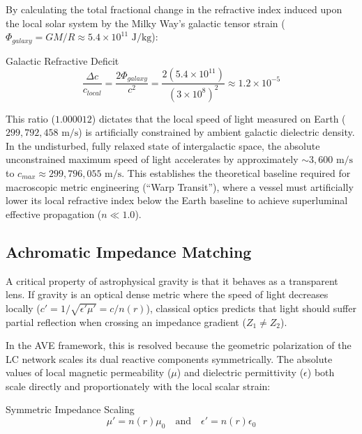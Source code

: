 By calculating the total fractional change in the refractive index induced upon the local solar system by the Milky Way's galactic tensor strain ($\Phi_{galaxy} = GM/R \approx 5.4 \times 10^{11} \text{ J/kg}$):
\begin{resultbox}{Galactic Refractive Deficit}
\begin{equation}
    \frac{\Delta c}{c_{local}} = \frac{2\Phi_{galaxy}}{c^2} = \frac{2(5.4 \times 10^{11})}{(3 \times 10^8)^2} \approx 1.2 \times 10^{-5}
\end{equation}
\end{resultbox}

This ratio ($1.000012$) dictates that the local speed of light measured on Earth ($299,792,458 \text{ m/s}$) is artificially constrained by ambient galactic dielectric density. In the undisturbed, fully relaxed state of intergalactic space, the absolute unconstrained maximum speed of light accelerates by approximately $\sim 3,600 \text{ m/s}$ to $c_{max} \approx 299,796,055 \text{ m/s}$. This establishes the theoretical baseline required for macroscopic metric engineering (``Warp Transit''), where a vessel must artificially lower its local refractive index below the Earth baseline to achieve superluminal effective propagation ($n \ll 1.0$).

\subsection{Achromatic Impedance Matching}
\label{sec:achromatic_matching}
A critical property of astrophysical gravity is that it behaves as a transparent lens. If gravity is an optical dense metric where the speed of light decreases locally ($c' = 1/\sqrt{\epsilon' \mu'} = c/n(r)$), classical optics predicts that light should suffer partial reflection when crossing an impedance gradient ($Z_1 \neq Z_2$). 

In the AVE framework, this is resolved because the geometric polarization of the LC network scales its dual reactive components symmetrically. The absolute values of local magnetic permeability ($\mu$) and dielectric permittivity ($\epsilon$) both scale directly and proportionately with the local scalar strain: 
\begin{resultbox}{Symmetric Impedance Scaling}
\begin{equation}
    \mu' = n(r)\mu_0 \quad \text{and} \quad \epsilon' = n(r)\epsilon_0
\end{equation}
\end{resultbox}

